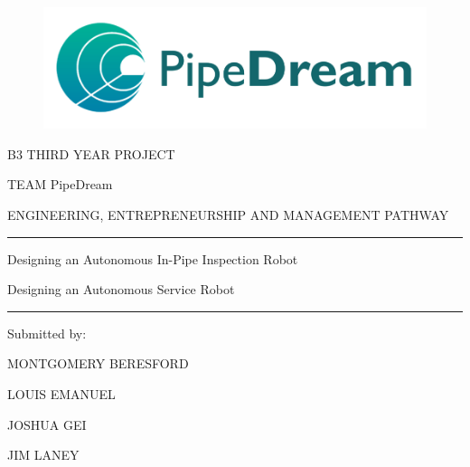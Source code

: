 \documentclass[11pt]{article}		%
\begin{document}
	
	\flushleft
	\raggedright

	\begin{center}
	
		\vspace*{1cm}
		
		\begin{figure}
			\centering
			\includegraphics[width=\textwidth]{PipeDreamLogo}
		\end{figure}
						
		\vspace*{-2cm}
		
		\fontsize{20pt}{22pt}\selectfont
		B3 THIRD YEAR PROJECT
		
		TEAM PipeDream
		
		\vspace*{1cm}
		
		\fontsize{12pt}{14pt}\selectfont		
		ENGINEERING, ENTREPRENEURSHIP AND MANAGEMENT PATHWAY
		
		\vspace*{0.5cm}
		
		\rule{0.95\textwidth}{1pt}

		\fontsize{20pt}{22pt}\selectfont
		Designing an Autonomous In-Pipe Inspection Robot
		
		\fontsize{12pt}{14pt}\selectfont
		Designing an Autonomous Service Robot
		
		
		\rule{0.95\textwidth}{1pt}
		
		\vspace*{1.5cm}
				
		\fontsize{12pt}{14pt}\selectfont
		Submitted by:
		
		\fontsize{14pt}{16pt}\selectfont
		MONTGOMERY BERESFORD
		
		LOUIS EMANUEL
		
		JOSHUA GEI
		
		JIM LANEY
		
		\fontsize{11pt}{\baselineskip}\selectfont
		\thispagestyle{empty} %
	\end{center}
\end{document}
